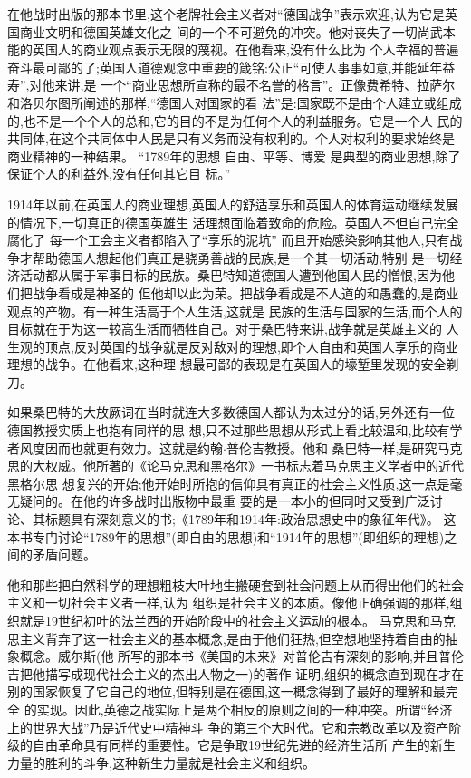 ﻿\documentclass[12pt]{article}
\begin{document}
在他战时出版的那本书里,这个老牌社会主义者对``德国战争''表示欢迎,认为它是英国商业文明和德国英雄文化之
间的一个不可避免的冲突。他对丧失了一切尚武本能的英国人的商业观点表示无限的蔑视。在他看来,没有什么比为
个人幸福的普遍奋斗最可鄙的了;英国人道德观念中重要的箴铭:公正``可使人事事如意,并能延年益寿'',对他来讲,是
一个``商业思想所宣称的最不名誉的格言''。正像费希特、拉萨尔和洛贝尔图所阐述的那样,``德国人对国家的看
法''是:国家既不是由个人建立或组成的,也不是一个个人的总和,它的目的不是为任何个人的利益服务。它是一个人
民的共同体,在这个共同体中人民是只有义务而没有权利的。个人对权利的要求始终是商业精神的一种结果。
``1789年的思想 \myrule 自由、平等、博爱 \myrule 是典型的商业思想,除了保证个人的利益外,没有任何其它目
标。''

1914年以前,在英国人的商业理想,英国人的舒适享乐和英国人的体育运动继续发展的情况下,一切真正的德国英雄生
活理想面临着致命的危险。英国人不但自己完全腐化了 \myrule 每一个工会主义者都陷入了``享乐的泥坑''
\myrule 而且开始感染影响其他人,只有战争才帮助德国人想起他们真正是骁勇善战的民族,是一个其一切活动,特别
是一切经济活动都从属于军事目标的民族。桑巴特知道德国人遭到他国人民的憎恨,因为他们把战争看成是神圣的
\myrule 但他却以此为荣。把战争看成是不人道的和愚蠢的,是商业观点的产物。有一种生活高于个人生活,这就是
民族的生活与国家的生活,而个人的目标就在于为这一较高生活而牺牲自己。对于桑巴特来讲,战争就是英雄主义的
人生观的顶点,反对英国的战争就是反对敌对的理想,即个人自由和英国人享乐的商业理想的战争。在他看来,这种理
想最可鄙的表现是\myrule 在英国人的壕堑里发现的安全剃刀。

如果桑巴特的大放厥词在当时就连大多数德国人都认为太过分的话,另外还有一位德国教授实质上也抱有同样的思
想,只不过那些思想从形式上看比较温和,比较有学者风度因而也就更有效力。这就是约翰$\cdot$普伦吉教授。他和
桑巴特一样,是研究马克思的大权威。他所著的《论马克思和黑格尔》一书标志着马克思主义学者中的近代黑格尔思
想复兴的开始;他开始时所抱的信仰具有真正的社会主义性质,这一点是毫无疑问的。在他的许多战时出版物中最重
要的是一本小的但同时又受到广泛讨论、其标题具有深刻意义的书;《1789年和1914年:政治思想史中的象征年代》。
这本书专门讨论``1789年的思想''(即自由的思想)和``1914年的思想''(即组织的理想)之间的矛盾问题。

他和那些把自然科学的理想粗枝大叶地生搬硬套到社会问题上从而得出他们的社会主义和一切社会主义者一样,认为
组织是社会主义的本质。像他正确强调的那样,组织就是19世纪初叶的法兰西的开始阶段中的社会主义运动的根本。
马克思和马克思主义背弃了这一社会主义的基本概念,是由于他们狂热,但空想地坚持着自由的抽象概念。威尔斯(他
所写的那本书《美国的未来》对普伦吉有深刻的影响,并且普伦吉把他描写成现代社会主义的杰出人物之一)的著作
证明,组织的概念直到现在才在别的国家恢复了它自己的地位,但特别是在德国,这一概念得到了最好的理解和最完全
的实现。因此,英德之战实际上是两个相反的原则之间的一种冲突。所谓``经济上的世界大战''乃是近代史中精神斗
争的第三个大时代。它和宗教改革以及资产阶级的自由革命具有同样的重要性。它是争取19世纪先进的经济生活所
产生的新生力量的胜利的斗争,这种新生力量就是社会主义和组织。
\end{document}
